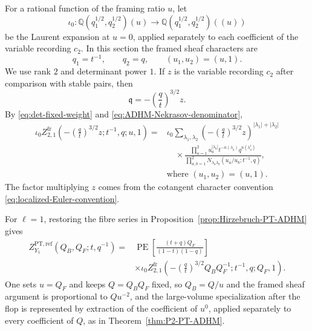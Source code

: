 \documentclass{amsart}
\theoremstyle{definition}
\numberwithin{equation}{section}
\newcommand{\Q}{\mathbb Q}
\newcommand{\PE}{\operatorname{PE}}
\newcommand{\PT}{\mathrm{PT}}
\begin{document}
For a rational function of the framing ratio \(u\), let
\begin{equation}
 \iota_0:
 \Q(q_1^{1/2},q_2^{1/2})(u)
 \longrightarrow
 \Q(q_1^{1/2},q_2^{1/2})((u))
\label{eq:global-u-expansion}
\end{equation}
be the Laurent expansion at \(u=0\), applied separately to each coefficient of the variable recording \(c_2\).  In this section the framed sheaf characters are
\begin{equation}
 q_1=t^{-1},\qquad q_2=q,\qquad (u_1,u_2)=(u,1).
\label{eq:introduction-variable-change}
\end{equation}
We use rank \(2\) and determinant power \(1\).  If \(z\) is the variable recording \(c_2\) after comparison with stable pairs, then
\begin{equation}
 \mathfrak q=-\left(\frac qt\right)^{3/2}z.
\label{eq:rank-two-specialization}
\end{equation}
By \eqref{eq:det-fixed-weight} and \eqref{eq:ADHM-Nekrasov-denominator},
\begin{equation}
\begin{aligned}
 \iota_0Z_{2,1}^{\mathrm{fr}}
 \left(-\left(\frac qt\right)^{3/2}z;t^{-1},q;u,1\right)
 ={}&\iota_0\sum_{\lambda_1,\lambda_2}
 \left(-\left(\frac qt\right)^{3/2}z\right)^{|\lambda_1|+|\lambda_2|}\\
 &\quad\times
 \frac{\displaystyle\prod_{a=1}^2
 u_a^{|\lambda_a|}t^{-n(\lambda_a)}
 q^{n(\lambda_a^t)}}
 {\displaystyle\prod_{a,b=1}^2
 N_{\lambda_a\lambda_b}
 (u_a/u_b;t^{-1},q)},
 \\
 &\text{where }(u_1,u_2)=(u,1).
\end{aligned}
\label{eq:geometric-fixed-point-sum}
\end{equation}
The factor multiplying \(z\) comes from the cotangent character convention \eqref{eq:localized-Euler-convention}.

For \(\ell=1\), restoring the fibre series in Proposition~\ref{prop:Hirzebruch-PT-ADHM} gives
\begin{equation}
\begin{aligned}
 Z_{Y_1}^{\PT,\mathrm{ref}}(Q_B,Q_F;t,q^{-1})
 ={}&\PE\left[\frac{(t+q)Q_F}{(1-t)(1-q)}\right]\\
 &\times\iota_0 Z_{2,1}^{\mathrm{fr}}\left(
 -\left(\frac qt\right)^{3/2}Q_BQ_F^{-1};
 t^{-1},q;Q_F,1\right).
\end{aligned}
\label{eq:F1-verified-finite-parameter-form}
\end{equation}
One sets \(u=Q_F\) and keeps \(Q=Q_BQ_F\) fixed, so \(Q_B=Q/u\) and the framed sheaf argument is proportional to \(Qu^{-2}\), and the large-volume specialization after the flop is represented by extraction of the coefficient of \(u^0\), applied separately to every coefficient of \(Q\), as in Theorem~\ref{thm:P2-PT-ADHM}.
\end{document}
